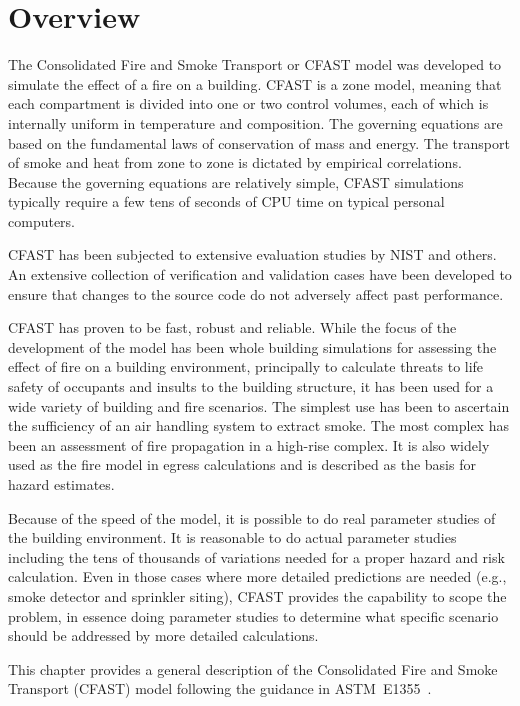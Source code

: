 \chapter{Overview}

The Consolidated Fire and Smoke Transport or CFAST model was developed to simulate the effect of a fire on a building. CFAST is a zone model, meaning that each compartment is divided into one or two control volumes, each of which is internally uniform in temperature and composition. The governing equations are based on the fundamental laws of conservation of mass and energy. The transport of smoke and heat from zone to zone is dictated by empirical correlations. Because the governing equations are relatively simple, CFAST simulations typically require a few tens of seconds of CPU time on typical personal computers.

CFAST has been subjected to extensive evaluation studies by NIST and others. An extensive collection of verification and validation cases have been developed to ensure that changes to the source code do not adversely affect past performance.

CFAST has proven to be fast, robust and reliable. While the focus of the development of the model has been whole building simulations for assessing the effect of fire on a building environment, principally to calculate threats to life safety of occupants and insults to the building structure, it has been used for a wide variety of building and fire scenarios. The simplest use has been to ascertain the sufficiency of an air handling system to extract smoke. The most complex has been an assessment of fire propagation in a high-rise complex. It is also widely used as the fire model in egress calculations and is described as the basis for hazard estimates.

Because of the speed of the model, it is possible to do real parameter studies of the building environment. It is reasonable to do actual parameter studies including the tens of thousands of variations needed for a proper hazard and risk calculation. Even in those cases where more detailed predictions are needed (e.g., smoke detector and sprinkler siting), CFAST provides the capability to scope the problem, in essence doing parameter studies to determine what specific scenario should be addressed by more detailed calculations.

This chapter provides a general description of the Consolidated Fire and Smoke Transport (CFAST) model following the guidance in ASTM~E1355~\cite{ASTM:E1355}.


